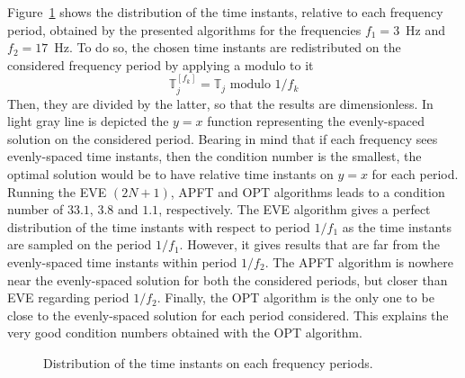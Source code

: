 Figure~\ref{fig:distribution_tlv} shows the distribution of the time
instants, relative to each frequency period, obtained by the presented
algorithms for the frequencies $f_1 = 3$~Hz and $f_2 = 17$~Hz. 
To do so, the chosen time instants are redistributed
on the considered frequency period by applying a modulo to it
\begin{equation}
  \label{eq:1}
  \mathbb{T}^{[f_k]}_j =  \mathbb{T}_j \text{ modulo } 1/f_k
\end{equation}
Then, they are divided by the latter, so that the results are
dimensionless.  In light gray line is depicted the $y=x$ function
representing the evenly-spaced solution on the considered period.
Bearing in mind that if each frequency sees evenly-spaced time instants,
then the condition number is the smallest, the optimal solution would
be to have relative time instants on $y=x$ for each period.  Running the
EVE $(2N + 1)$, APFT and OPT algorithms leads to a condition number of $33.1$,
$3.8$ and $1.1$, respectively.  The EVE algorithm gives a perfect distribution
of the time instants with respect to
period $1/f_1$ as the time instants are sampled on the period
$1/f_1$. However, it gives results that are far from the evenly-spaced time instants
within period $1/f_2$. The APFT algorithm is nowhere near the evenly-spaced
solution for both the considered periods, but closer than EVE regarding
period $1/f_2$. Finally, the OPT algorithm is the only one to be close
to the evenly-spaced solution for each period considered. This explains the
very good condition numbers obtained with the OPT algorithm.
\begin{figure}[htp]
  \centering 
  \caption{Distribution of the time instants on each frequency periods.}
  \label{fig:distribution_tlv}
\end{figure}

